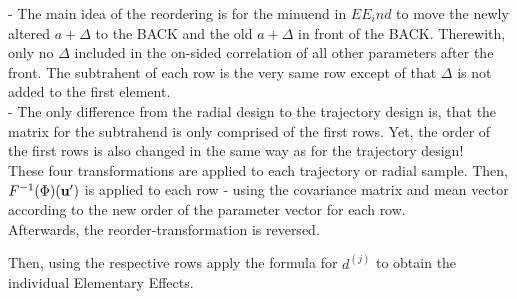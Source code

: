 \documentclass[a4paper,12pt]{article}
\begin{document}
- The main idea of the reordering is for the minuend in $EE_ind$ to move the newly altered $a+\Delta$ to the BACK and the old $a+\Delta$ in front of the BACK. Therewith, only no $\Delta$ included in the on-sided correlation of all other parameters after the front. The subtrahent of each row is the very same row except of that $\Delta$ is not added to the first element. \\

- The only difference from the radial design to the trajectory design is, that the matrix for the subtrahend is only comprised of the first rows. Yet, the order of the first rows is also changed in the same way as for the trajectory design! \\

These four transformations are applied to each trajectory or radial sample. Then, $F^{-1}(\Phi)(\bold{u'})$ is applied to each row - using the covariance matrix and mean vector according to the new order of the parameter vector for each row. \\

Afterwards, the reorder-transformation is reversed.



Then, using the respective rows \cite{ge2017extending} apply the formula for $d^{(j)}$ to obtain the individual Elementary Effects. \\
\end{document}
